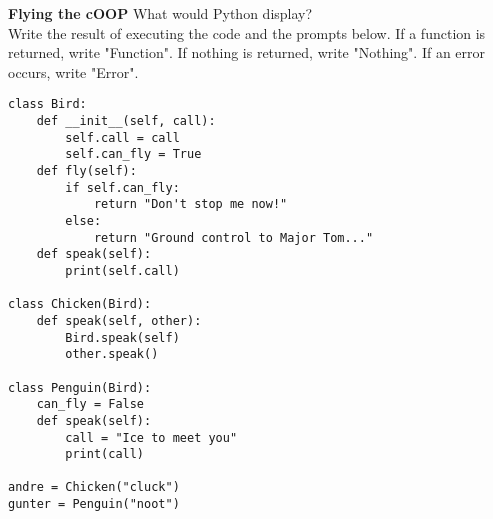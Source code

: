 \twocolumn
\begin{blocksection}

\question \textbf{Flying the cOOP} What would Python display? \\
Write the result of executing the code and the prompts below. If a function is returned, write "Function". If nothing is returned, write "Nothing". If an error occurs, write "Error".

\vspace{2\baselineskip}

\begin{lstlisting}
class Bird:
    def __init__(self, call):
        self.call = call
        self.can_fly = True
    def fly(self):
        if self.can_fly:
            return "Don't stop me now!"
        else:
            return "Ground control to Major Tom..."
    def speak(self):
        print(self.call)

class Chicken(Bird):
    def speak(self, other):
        Bird.speak(self)
        other.speak()

class Penguin(Bird):
    can_fly = False
    def speak(self):
        call = "Ice to meet you"
        print(call)

andre = Chicken("cluck")
gunter = Penguin("noot")
\end{lstlisting}
\end{blocksection}

